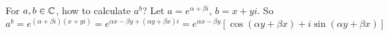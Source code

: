 \begin{theorem}
    For $a, b \in \mathbb{C}$, how to calculate $a^b$? Let $a = e^{\alpha + \beta i}$, $b = x + yi$. So
    \begin{equation}
        a^b = e^{(\alpha + \beta i) (x + yi)} = e^{\alpha x - \beta y + (\alpha y + \beta x)i} = e^{\alpha x - \beta y} \left[\cos (\alpha y + \beta x) + i \sin (\alpha y + \beta x)\right ]
    \end{equation}
\end{theorem}


































































































